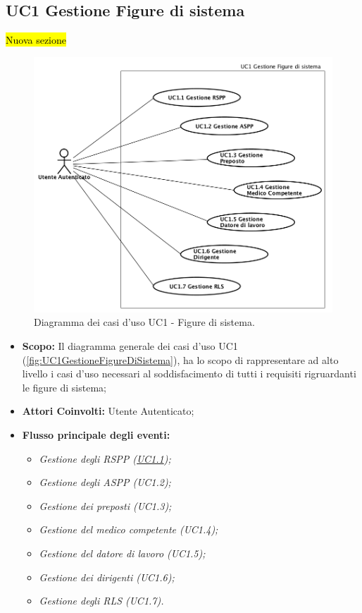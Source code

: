 	\subsection{UC1 Gestione Figure di sistema}
	\label{section:UC1}
	\hl{Nuova sezione}
	\begin{figure}[H]
		\begin{center}
			\includegraphics[width=14cm]{Pics/UC1GestioneFigureDiSistema.png}
			\caption{
				Diagramma dei casi d'uso UC1 - Figure di sistema.}
			\label{fig:UC1GestioneFigureDiSistema}
		\end{center}
	\end{figure}
	\begin{itemize}
		\item \textbf{Scopo:} Il diagramma generale dei casi d'uso UC1 (\autoref{fig:UC1GestioneFigureDiSistema}), ha lo scopo di rappresentare ad alto livello i casi d'uso necessari al soddisfacimento di tutti i requisiti rigruardanti le figure di sistema;
		\item \textbf{Attori Coinvolti:} Utente Autenticato;
		\item \textbf{Flusso principale degli eventi:} 
		\begin{itemize}
			\item \textit{Gestione degli RSPP (\hyperref[section:UC1_1]{UC1.1});}
			\item \textit{Gestione degli ASPP (UC1.2);}
			\item \textit{Gestione dei preposti (UC1.3);}
			\item \textit{Gestione del medico competente (UC1.4);}
			\item \textit{Gestione del datore di lavoro (UC1.5);}
			\item \textit{Gestione dei dirigenti (UC1.6);}
			\item \textit{Gestione degli RLS (UC1.7).}
		\end{itemize}
	\end{itemize}
		
